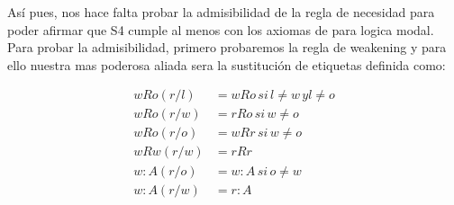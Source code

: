 Así pues, nos hace falta probar la admisibilidad de la regla de necesidad para poder afirmar que S4 cumple al menos con los axiomas de \K para logica modal. Para probar la admisibilidad, primero probaremos la regla de weakening y para ello nuestra mas poderosa aliada sera la sustitución de etiquetas definida como:

\begin{align*}
  wRo(r/l) &= wRo \, si \, l \neq w \, y l \neq o \\
  wRo(r/w) &= rRo \, si \, w \neq o \\
  wRo(r/o) &= wRr \, si \, w \neq o \\
  wRw(r/w) &= rRr \\
  w:A(r/o) &= w:A \, si \, o \neq w \\
  w:A(r/w) &= r:A
\end{align*}


